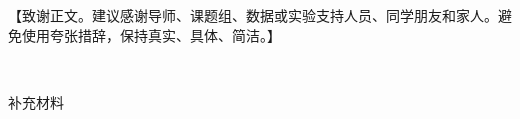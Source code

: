 \documentclass{cauugthesis}
\begin{document}


\begin{acknowledgements}
【致谢正文。建议感谢导师、课题组、数据或实验支持人员、同学朋友和家人。避免使用夸张措辞，保持真实、具体、简洁。】

\begin{flushright}
  \textit{\thethesisauthor} \\
  \thethesisdate
\end{flushright}
\end{acknowledgements}

\begin{appendixsection}{补充材料}

\end{appendixsection}

\begin{authorinfo}

\end{authorinfo}
\end{document}
